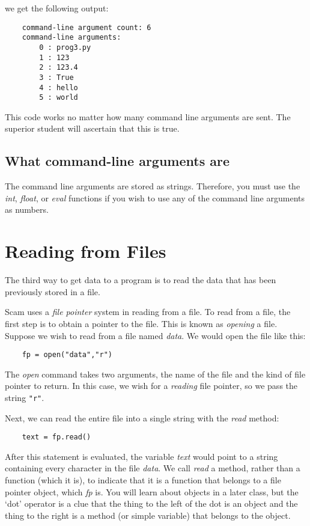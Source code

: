 we get the following output:

\begin{verbatim}
    command-line argument count: 6
    command-line arguments:
        0 : prog3.py
        1 : 123
        2 : 123.4
        3 : True
        4 : hello
        5 : world
\end{verbatim}

This code works no matter how many command line arguments are sent.
The superior student will ascertain that this is true.

\subsection{What command-line arguments are}

The command line arguments  are stored as strings.
Therefore, you must use the {\it int}, {\it float}, or {\it eval} functions
if you
wish to use any of the command line arguments as numbers.

\section{Reading from Files}

The third way to get data to a program is to read the
data that has been previously stored in a file.

Scam uses a {\it file pointer} system in reading from a
file. To read from a file, the first
step is to obtain a pointer to the file. This is
known as {\it opening} a file. Suppose
we wish to read from a file named {\it data}. We
would open the file like this:

\begin{verbatim}
    fp = open("data","r")
\end{verbatim}

The {\it open} command takes two arguments, the name of the
file and the kind of file pointer to return. In this
case, we wish for a {\it reading} file pointer, so we pass
the string {\tt "r"}.

Next, we can read the entire file into a single string with
the {\it read} method:

\begin{verbatim}
    text = fp.read()
\end{verbatim}

After this statement is evaluated, the variable {\it text} would
point to a string containing every character in the file {\it data}.
We call {\it read} a method, rather than a function (which it is), to
indicate that it is a function that belongs to a file pointer
object, which {\it fp} is. You will learn about objects 
in a later class, but the `dot' operator is a clue that
the thing to the left of the dot is an object and the
thing to the right is a method (or simple variable) that
belongs to the object.


